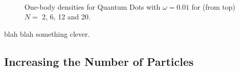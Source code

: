 \begin{figure}
\begin{center}
   \\
  \caption{One-body densities for Quantum Dots with $\omega=0.01$ for (from top) $N=$ 2, 6, 12 and 20.}
  \label{fig:OBD_pure_w001}
 \end{center}
\end{figure}

blah blah something clever.

 
 \clearpage

 \subsection{Increasing the Number of Particles}
 
